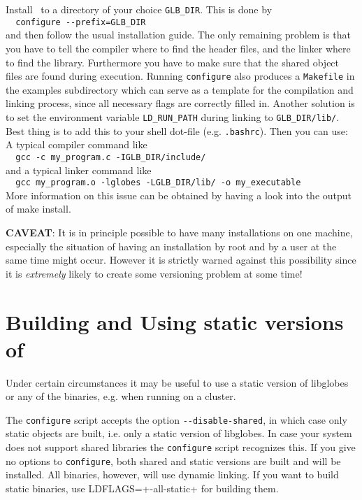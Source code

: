 \begin{appendix}
Install \GLOBES\ to a directory of your choice \verb+GLB_DIR+. This is done by\\
\verb+  configure --prefix=GLB_DIR+\\ 
and then follow the usual
installation guide. The only remaining problem is that you
have to tell the compiler where to find the header files, and
the linker where to find the library. Furthermore you have to
make sure that the shared object files are found during
execution. Running \verb+configure+ also produces a \verb+Makefile+ in
the examples subdirectory which can serve as a template for
the compilation and linking process, since all necessary flags
are correctly filled in. Another solution is to set the
environment variable \verb+LD_RUN_PATH+ during linking to
\verb+GLB_DIR/lib/+. Best thing is to add this to your shell dot-file
(e.g. \verb+.bashrc+). Then you can use: A typical compiler command
like\\
\verb+  gcc -c my_program.c -IGLB_DIR/include/+\\
and a typical linker command like\\
\verb+  gcc my_program.o -lglobes -LGLB_DIR/lib/ -o my_executable+\\
More information on this issue can be obtained by having a look into
the output of make install.

{\bf CAVEAT}: It is in principle possible to have many installations on one
machine, especially the situation of having an installation by root
and by a user at the same time might occur. However it is strictly
warned against this possibility since it is \emph{extremely} likely to
create some versioning problem at some time!

\section*{Building and Using static versions of \GLOBES}


Under certain circumstances it may be useful to use a static version of
libglobes or any of the binaries, e.g. when running on a cluster.

The \verb+configure+ script accepts the option \verb+--disable-shared+, in
which case only static objects are built, i.e. only a static
version of libglobes. In case your system does not support shared
libraries the \verb+configure+ script recognizes this. If you give no
options to \verb+configure+, both shared and static versions are built
and will be installed. All binaries, however, will use dynamic
linking. If you want to build static binaries, use
LDFLAGS=+-all-static+ for building them.


\end{appendix}

